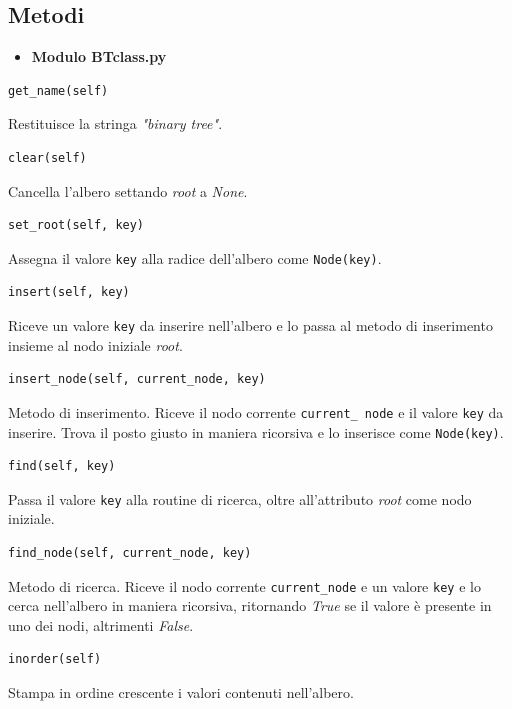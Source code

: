 \documentclass{article}
\begin{document}
\subsection{Metodi}
\begin{itemize}
    \item \textbf{Modulo BTclass.py}
\end{itemize}
\begin{verbatim}get_name(self)\end{verbatim}
Restituisce la stringa \emph{"binary tree"}.
\begin{verbatim}clear(self)\end{verbatim}
Cancella l'albero settando \emph{root} a \emph{None}.
\begin{verbatim}set_root(self, key)\end{verbatim}
Assegna il valore \verb|key| alla radice dell'albero come \verb|Node(key)|.
\begin{verbatim}insert(self, key)\end{verbatim}
Riceve un valore \verb|key| da inserire nell'albero e lo passa al metodo di inserimento insieme al nodo iniziale \emph{root}.
\begin{verbatim}insert_node(self, current_node, key)\end{verbatim}
Metodo di inserimento. Riceve il nodo corrente \verb|current_ node| e il valore \verb|key| da inserire. Trova il posto giusto in maniera ricorsiva e lo inserisce come \verb|Node(key)|.
\begin{verbatim}find(self, key)\end{verbatim}
Passa il valore \verb|key| alla routine di ricerca, oltre all'attributo \emph{root} come nodo iniziale.
\begin{verbatim}find_node(self, current_node, key)\end{verbatim}
Metodo di ricerca. Riceve il nodo corrente \verb|current_node| e un valore \verb|key| e lo cerca nell'albero in maniera ricorsiva, ritornando \emph{True} se il valore è presente in uno dei nodi, altrimenti \emph{False}.
\begin{verbatim}inorder(self)\end{verbatim}
Stampa in ordine crescente i valori contenuti nell'albero.\\
\end{document}
